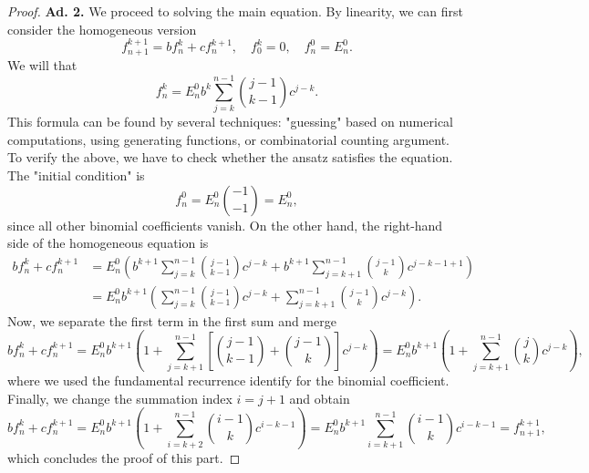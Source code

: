 \documentclass[10pt,a4paper]{amsart}
\begin{document}
\begin{proof}
	\medskip\noindent\textbf{Ad. 2.} We proceed to solving the main equation. By linearity, we can first consider the homogeneous version
	\begin{equation}
		f^{k+1}_{n+1} = b f^k_n + c f^{k+1}_{n}, \quad f^k_0 = 0, \quad f^0_n = E^0_n.
	\end{equation}
	We will that
	\begin{equation}
		f^k_n = E^0_n b^k \sum_{j=k}^{n-1} \binom{j-1}{k-1} c^{j-k}.
	\end{equation}
	This formula can be found by several techniques: "guessing" based on numerical computations, using generating functions, or combinatorial counting argument. To verify the above, we have to check whether the ansatz satisfies the equation. The "initial condition" is 
	\begin{equation}
		f^0_n = E^0_n \binom{-1}{-1} = E^0_n,
	\end{equation}
	since all other binomial coefficients vanish. On the other hand, the right-hand side of the homogeneous equation is
	\begin{equation}
		\begin{split}
			b f^k_n + c f^{k+1}_{n} 
			&= E^0_n \left( b^{k+1} \sum_{j=k}^{n-1} \binom{j-1}{k-1} c^{j-k} + b^{k+1} \sum_{j=k+1}^{n-1} \binom{j-1}{k} c^{j-k-1+1}\right) \\
			&= E^0_n b^{k+1} \left( \sum_{j=k}^{n-1} \binom{j-1}{k-1} c^{j-k} + \sum_{j=k+1}^{n-1} \binom{j-1}{k} c^{j-k}\right).
		\end{split}
	\end{equation} 
	Now, we separate the first term in the first sum and merge
	\begin{equation}
		b f^k_n + c f^{k+1}_{n} = E^0_n b^{k+1} \left(1+ \sum_{j=k+1}^{n-1} \left[\binom{j-1}{k-1} + \binom{j-1}{k}\right]c^{j-k}\right) = E^0_n b^{k+1} \left(1+ \sum_{j=k+1}^{n-1}\binom{j}{k} c^{j-k}\right),
	\end{equation} 
	where we used the fundamental recurrence identify for the binomial coefficient. Finally, we change the summation index $i = j+1$ and obtain
	\begin{equation}
		b f^k_n + c f^{k+1}_{n} = E^0_n b^{k+1} \left(1+ \sum_{i=k+2}^{n-1}\binom{i-1}{k} c^{i-k-1}\right) = E^0_n b^{k+1} \sum_{i=k+1}^{n-1}\binom{i-1}{k} c^{i-k-1} = f^{k+1}_{n+1},
	\end{equation} 
	which concludes the proof of this part. 
	

\end{proof}
\end{document}

